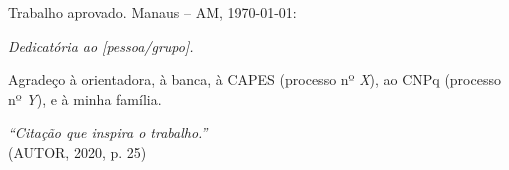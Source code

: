 \documentclass[
    12pt,                       %
    openright,                  %
    twoside,                    %
    a4paper,                    %
    chapter=TITLE,              %
    sumario=tradicional,        %
    section=TITLE,
    english,                    %
    spanish,                    %
    brazil                      %
]{abntex2}
\begin{document}
\frenchspacing

\pretextual

\imprimircapa
\imprimirfolhaderosto


\begin{folhadeaprovacao}
\begin{center}
{\ABNTEXchapterfont\large\imprimirautor}

\vspace*{\fill}\vspace*{\fill}
\begin{center}
\ABNTEXchapterfont\bfseries\Large\imprimirtitulo
\end{center}
\vspace*{\fill}

\hspace{.45\textwidth}\begin{minipage}{.5\textwidth}
\imprimirpreambulo
\end{minipage}\vspace*{\fill}
\end{center}

Trabalho aprovado. Manaus -- AM, \today:

\assinatura{\textbf{\imprimirorientadorRotulo} \\ \imprimirorientador}
\end{folhadeaprovacao}

\begin{dedicatoria}
\vspace*{\fill}
\centering
\noindent
\textit{Dedicatória ao [pessoa/grupo].}
\vspace*{\fill}
\end{dedicatoria}

\begin{agradecimentos}
Agradeço à orientadora, à banca, à CAPES (processo nº \textit{X}),
ao CNPq (processo nº \textit{Y}), e à minha família.
\end{agradecimentos}

\begin{epigrafe}
\vspace*{\fill}
\begin{flushright}
\textit{``Citação que inspira o trabalho.''} \\
(AUTOR, 2020, p. 25)
\end{flushright}
\end{epigrafe}
\end{document}
